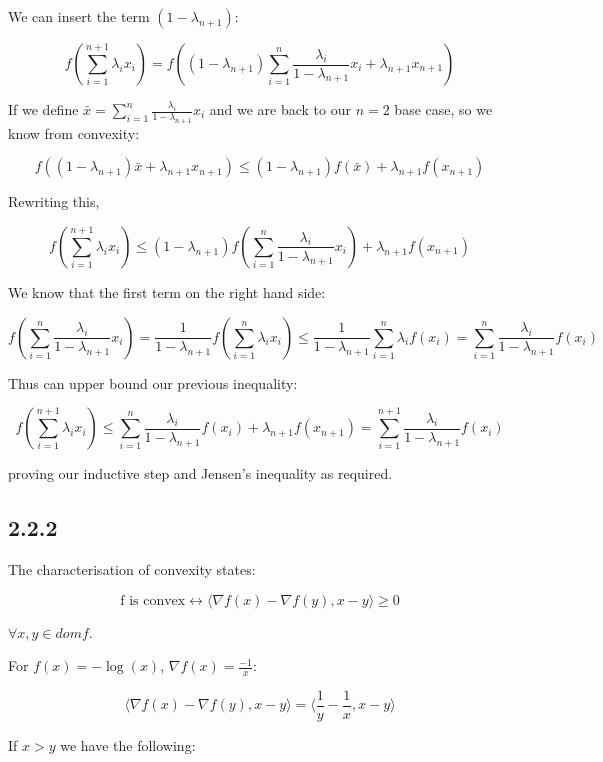 \documentclass[12pt]{article}
\begin{document}
We can insert the term $(1-\lambda_{n+1})$:

\[f\left(\sum_{i=1}^{n+1} \lambda_i x_i\right) = f\left((1-\lambda_{n+1}) \sum_{i=1}^n \frac{\lambda_i}{1-\lambda_{n+1}} x_i + \lambda_{n+1} x_{n+1}\right)\]


If we define $\bar{x} = \sum_{i=1}^n \frac{\lambda_i}{1-\lambda_{n+1}} x_i$ and we are back to our $n=2$ base case, so we know from convexity:

\[ f\left((1-\lambda_{n+1})\bar{x} + \lambda_{n+1} x_{n+1}\right) \leq (1-\lambda_{n+1}) f\left( \bar{x}\right) + \lambda_{n+1} f\left( x_{n+1}\right)\]

Rewriting this,

\[f\left(\sum_{i=1}^{n+1} \lambda_i x_i\right) \leq (1-\lambda_{n+1}) f\left( \sum_{i=1}^n \frac{\lambda_i}{1-\lambda_{n+1}} x_i\right) + \lambda_{n+1} f\left( x_{n+1}\right)\]

We know that the first term on the right hand side:

\[f\left( \sum_{i=1}^n \frac{\lambda_i}{1-\lambda_{n+1}} x_i\right) = \frac{1}{{1-\lambda_{n+1}}}f\left( \sum_{i=1}^n \lambda_i x_i\right) \leq \frac{1}{{1-\lambda_{n+1}}} \sum_{i=1}^n \lambda_i f \left(x_i\right) =  \sum_{i=1}^n \frac{\lambda_i}{{1-\lambda_{n+1}}}  f \left(x_i\right)\]

Thus can upper bound our previous inequality:


\[f\left(\sum_{i=1}^{n+1} \lambda_i x_i\right)  \leq \sum_{i=1}^n \frac{\lambda_i}{{1-\lambda_{n+1}}}  f \left(x_i\right) + \lambda_{n+1} f\left( x_{n+1}\right) =\sum_{i=1}^{n+1} \frac{\lambda_i}{{1-\lambda_{n+1}}} f \left(x_i\right) \]

proving our inductive step and Jensen's inequality as required. \square


\subsection*{2.2.2}
The characterisation of convexity states:

\[\text{f is convex} \leftrightarrow \langle \nabla f(x) - \nabla f(y), x-y \rangle \geq 0\]

$\forall x, y \in dom f$.

For $f(x) = -\log(x)$, $\nabla f(x) = \frac{-1}{x}$:

\[\langle \nabla f(x) - \nabla f(y), x-y \rangle = \langle \frac{1}{y}-\frac{1}{x}, x-y \rangle\]

If $x>y$ we have the following:
\end{document}
